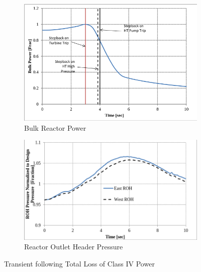 \documentclass[12pt]{article}
\begin{document}
\begin{figure}[h]
    \centering
    \begin{subfigure}{0.49\textwidth}
        \centering
        \includegraphics[width=\linewidth]{figs/class_iv_1.png}
        \caption{Bulk Reactor Power}
        \label{fig:fig6a}
    \end{subfigure}
    \hfill
    \begin{subfigure}{0.49\textwidth}
        \centering
        \includegraphics[width=\linewidth]{figs/class_iv_2.png}
        \caption{Reactor Outlet Header Pressure}
        \label{fig:fig6b}
    \end{subfigure}
    \caption{Transient following Total Loss of Class IV Power}
    \label{fig:6}
\end{figure}
\end{document}
